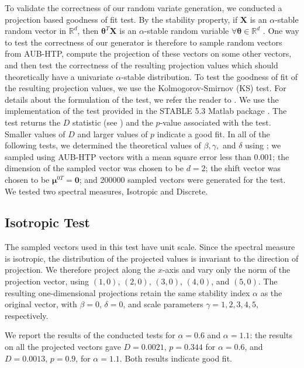 To validate the correctness of our random variate generation, we conducted a projection based goodness of fit test. By the stability property, if $\mathbf{X}$ is an $\alpha$-stable random vector in $\mathbb{R}^d$, then $\boldsymbol{\theta}^T\mathbf{X}$ is an $\alpha$-stable random variable $\forall \boldsymbol{\theta}\in\mathbb{R}^d$ \cite[Theorem 2.1.2]{SamorodnitskyGennady2000Snrp}. One way to test the correctness of our generator is therefore to sample random vectors from AUB-HTP, compute the projection of these vectors on some other vectors, and then test the correctness of the resulting projection values which should theoretically have a univariate $\alpha$-stable distribution. To test the goodness of fit of the resulting projection values, we use the Kolmogorov-Smirnov (KS) test. For details about the formulation of the test, we refer the reader to \cite[Section 10.6]{degroot2018probability}. We use the implementation of the test provided in the STABLE 5.3 Matlab package \cite{robustanalysis}. The test returns the $D$ statistic (see \cite[equation 10.6.2]{degroot2018probability}) and the $p$-value associated with the test. Smaller values of $D$ and larger values of $p$ indicate a good fit. In all of the following tests, we determined the theoretical values of $\beta,\gamma,$ and $\delta$ using \cite[equation. 2.3.3, equation. 2.3.4,  equation. 2.3.5]{SamorodnitskyGennady2000Snrp}; we sampled using AUB-HTP vectors with a mean square error less than 0.001; the dimension of the sampled vector was chosen to be $d=2$; the shift vector was chosen to be $\boldsymbol{\mu}^{0T}=\mathbf{0}$; and 200000 sampled vectors were generated for the test.  We tested two spectral measures, Isotropic and Discrete.
\subsection{Isotropic Test}
 The sampled vectors used in this test have unit scale. Since the spectral measure is isotropic, the distribution of the projected values is invariant to the direction of projection. We therefore project along the $x$-axis and vary only the norm of the projection vector, using $(1,0)$, $(2,0)$, $(3,0)$, $(4,0)$, and $(5,0)$. The resulting one-dimensional projections retain the same stability index $\alpha$ as the original vector, with $\beta=0$, $\delta=0$, and scale parameters $\gamma=1,2,3,4,5$, respectively.

We report the results of the conducted tests for $\alpha=0.6$ and $\alpha=1.1$: the results on all the projected vectors gave $D=0.0021$, $p=0.344$ for  $\alpha=0.6$, and $D=0.0013$, $p=0.9$, for $\alpha=1.1$. Both results indicate good fit.

